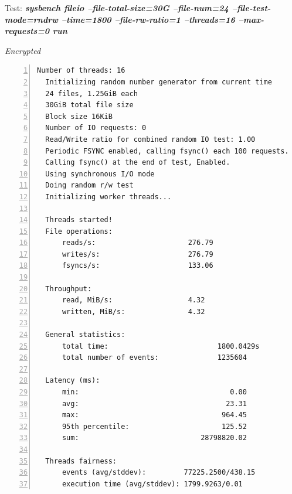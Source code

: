 \newpage
\begin{center}
  Test: \textbf{\textit{sysbench fileio --file-total-size=30G --file-num=24 --file-test-mode=rndrw --time=1800 --file-rw-ratio=1 --threads=16 --max-requests=0 run}}  
\end{center}
\vspace*{-\baselineskip}
\noindent\begin{minipage}[t]{0.45\linewidth}
  \centering
  \textit{Encrypted}
  \begin{lstlisting}[basicstyle=\tiny,frame=single, numbers=left, label=cpu_test1]
  Number of threads: 16
  Initializing random number generator from current time
  24 files, 1.25GiB each
  30GiB total file size
  Block size 16KiB
  Number of IO requests: 0
  Read/Write ratio for combined random IO test: 1.00
  Periodic FSYNC enabled, calling fsync() each 100 requests.
  Calling fsync() at the end of test, Enabled.
  Using synchronous I/O mode
  Doing random r/w test
  Initializing worker threads...
  
  Threads started!
  File operations:
      reads/s:                      276.79
      writes/s:                     276.79
      fsyncs/s:                     133.06
  
  Throughput:
      read, MiB/s:                  4.32
      written, MiB/s:               4.32
  
  General statistics:
      total time:                          1800.0429s
      total number of events:              1235604
  
  Latency (ms):
      min:                                    0.00
      avg:                                   23.31
      max:                                  964.45
      95th percentile:                      125.52
      sum:                             28798820.02
  
  Threads fairness:
      events (avg/stddev):         77225.2500/438.15
      execution time (avg/stddev): 1799.9263/0.01
  \end{lstlisting}
\end{minipage}
\hspace{0.5cm}
